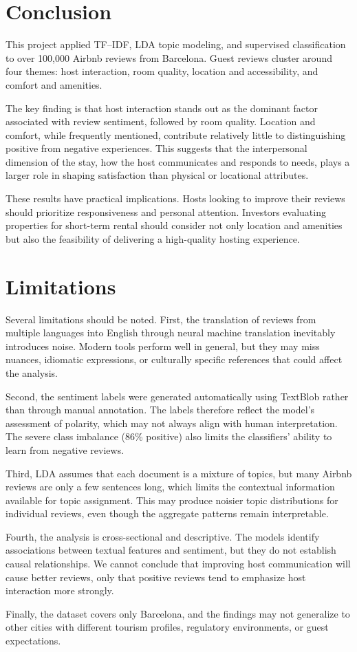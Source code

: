 \documentclass[11pt]{article}
\begin{document}
\section{Conclusion}

This project applied TF--IDF, LDA topic modeling, and supervised classification to over 100,000 Airbnb reviews from Barcelona. Guest reviews cluster around four themes: host interaction, room quality, location and accessibility, and comfort and amenities.

The key finding is that host interaction stands out as the dominant factor associated with review sentiment, followed by room quality. Location and comfort, while frequently mentioned, contribute relatively little to distinguishing positive from negative experiences. This suggests that the interpersonal dimension of the stay, how the host communicates and responds to needs, plays a larger role in shaping satisfaction than physical or locational attributes.

These results have practical implications. Hosts looking to improve their reviews should prioritize responsiveness and personal attention. Investors evaluating properties for short-term rental should consider not only location and amenities but also the feasibility of delivering a high-quality hosting experience.

\section{Limitations}

Several limitations should be noted. First, the translation of reviews from multiple languages into English through neural machine translation inevitably introduces noise. Modern tools perform well in general, but they may miss nuances, idiomatic expressions, or culturally specific references that could affect the analysis.

Second, the sentiment labels were generated automatically using TextBlob \citep{loria2020textblob} rather than through manual annotation. The labels therefore reflect the model's assessment of polarity, which may not always align with human interpretation. The severe class imbalance (86\% positive) also limits the classifiers' ability to learn from negative reviews.

Third, LDA assumes that each document is a mixture of topics, but many Airbnb reviews are only a few sentences long, which limits the contextual information available for topic assignment. This may produce noisier topic distributions for individual reviews, even though the aggregate patterns remain interpretable.

Fourth, the analysis is cross-sectional and descriptive. The models identify associations between textual features and sentiment, but they do not establish causal relationships. We cannot conclude that improving host communication will cause better reviews, only that positive reviews tend to emphasize host interaction more strongly.

Finally, the dataset covers only Barcelona, and the findings may not generalize to other cities with different tourism profiles, regulatory environments, or guest expectations.



\end{document}
